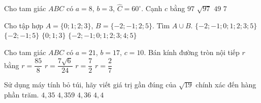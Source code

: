 \begin{ex}%
Cho tam giác $ABC$ có $a=8$, $b=3$, $\widehat{C}=60^\circ$. Cạnh $c$ bằng
\choice
{$97$}
{$\sqrt{97}$}
{$49$}
{\True $7$}
\end{ex}

\begin{ex}%
Cho tập hợp $A=\{0;1;2;3\}$, $B=\{-2;-1;2;5\}$. Tìm $A\cup B$.
\choice
{\True $\{-2;-1;0;1;2;3;5\}$}
{$\{-2;-1;5\}$}
{$\{0;1;3\}$}
{$\{-2;-1;0;1;2;3;4;5\}$}
\end{ex}

\begin{ex}%
Cho tam giác $ABC$ có $a=21$, $b=17$, $c=10$. Bán kính đường tròn nội tiếp $r$ bằng
\choice
{$r=\dfrac{85}{8}$}
{$r=\dfrac{7\sqrt{6}}{24}$}
{\True $r=\dfrac{7}{2}$}
{$r=\dfrac{2}{7}$}
\end{ex}

\begin{ex}%
Sử dụng máy tính bỏ túi, hãy viết giá trị gần đúng của $\sqrt{19}$ chính xác đến hàng phần trăm.
\choice
{$4{,}35$}
{$4{,}359$}
{\True $4{,}36$}
{$4{,}4$}
\end{ex}

